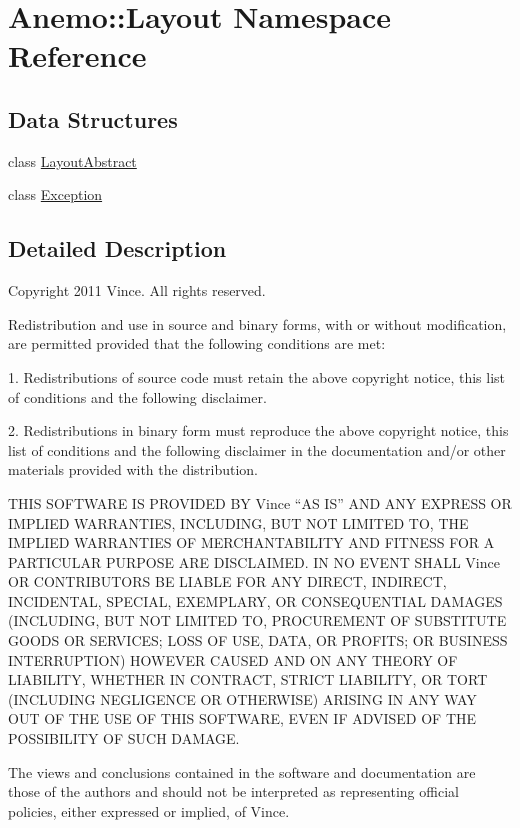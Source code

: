\hypertarget{namespace_anemo_1_1_layout}{
\section{Anemo::Layout Namespace Reference}
\label{namespace_anemo_1_1_layout}
}
\subsection*{Data Structures}
\begin{DoxyCompactItemize}
\item 
class \hyperlink{class_anemo_1_1_layout_1_1_layout_abstract}{LayoutAbstract}
\item 
class \hyperlink{class_anemo_1_1_layout_1_1_exception}{Exception}
\end{DoxyCompactItemize}


\subsection{Detailed Description}
Copyright 2011 Vince. All rights reserved.

Redistribution and use in source and binary forms, with or without modification, are permitted provided that the following conditions are met:

1. Redistributions of source code must retain the above copyright notice, this list of conditions and the following disclaimer.

2. Redistributions in binary form must reproduce the above copyright notice, this list of conditions and the following disclaimer in the documentation and/or other materials provided with the distribution.

THIS SOFTWARE IS PROVIDED BY Vince ``AS IS'' AND ANY EXPRESS OR IMPLIED WARRANTIES, INCLUDING, BUT NOT LIMITED TO, THE IMPLIED WARRANTIES OF MERCHANTABILITY AND FITNESS FOR A PARTICULAR PURPOSE ARE DISCLAIMED. IN NO EVENT SHALL Vince OR CONTRIBUTORS BE LIABLE FOR ANY DIRECT, INDIRECT, INCIDENTAL, SPECIAL, EXEMPLARY, OR CONSEQUENTIAL DAMAGES (INCLUDING, BUT NOT LIMITED TO, PROCUREMENT OF SUBSTITUTE GOODS OR SERVICES; LOSS OF USE, DATA, OR PROFITS; OR BUSINESS INTERRUPTION) HOWEVER CAUSED AND ON ANY THEORY OF LIABILITY, WHETHER IN CONTRACT, STRICT LIABILITY, OR TORT (INCLUDING NEGLIGENCE OR OTHERWISE) ARISING IN ANY WAY OUT OF THE USE OF THIS SOFTWARE, EVEN IF ADVISED OF THE POSSIBILITY OF SUCH DAMAGE.

The views and conclusions contained in the software and documentation are those of the authors and should not be interpreted as representing official policies, either expressed or implied, of Vince. 
